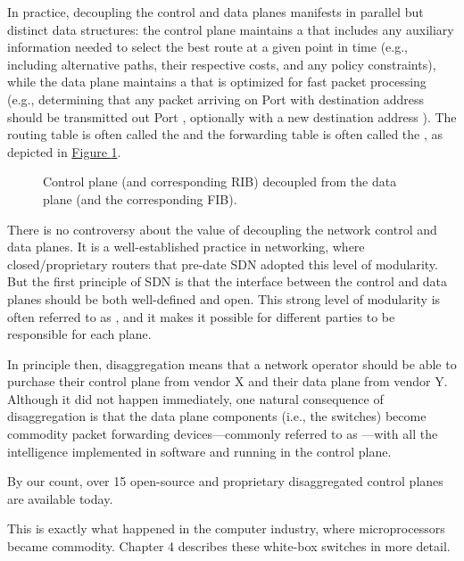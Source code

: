 \documentclass[letterpaper,11pt,english]{sphinxmanual}
\let\sphinxpxdimen\pdfpxdimen\else\newdimen\sphinxpxdimen
\begin{document}
In practice, decoupling the control and data planes manifests in
parallel but distinct data structures: the control plane maintains a
 that includes any auxiliary information needed to
select the best route at a given point in time (e.g., including
alternative paths, their respective costs, and any policy
constraints), while the data plane maintains a  that
is optimized for fast packet processing (e.g., determining that any
packet arriving on Port  with destination address  should be
transmitted out Port , optionally with a new destination address
). The routing table is often called the  and the forwarding table is often called the , as depicted in \hyperref[\detokenize{intro:fig-fib}]{Figure \ref{\detokenize{intro:fig-fib}}}.

\begin{figure}[htbp]
\centering
\capstart

\noindent\sphinxincludegraphics[width=300\sphinxpxdimen]{{Slide24}.png}
\caption{Control plane (and corresponding RIB) decoupled from the data
plane (and the corresponding FIB).}\label{\detokenize{intro:id11}}\label{\detokenize{intro:fig-fib}}\end{figure}

There is no controversy about the value of decoupling the network
control and data planes. It is a well-established practice in
networking, where closed/proprietary routers that pre-date SDN adopted
this level of modularity. But the first principle of SDN is that the
interface between the control and data planes should be both
well-defined and open. This strong level of modularity is often
referred to as , and it makes it possible for
different parties to be responsible for each plane.

In principle then, disaggregation means that a network operator should
be able to purchase their control plane from vendor X and their data
plane from vendor Y. Although it did not happen immediately, one
natural consequence of disaggregation is that the data plane
components (i.e., the switches) become commodity packet forwarding
devices—commonly referred to as —with all the
intelligence implemented in software and running in the control
plane.%
\begin{footnote}[1]\sphinxAtStartFootnote
By our count, over 15 open-source and proprietary disaggregated
control planes are available today.
%
\end{footnote} This is exactly what happened in the computer industry, where
microprocessors became commodity. Chapter 4 describes these white-box
switches in more detail.
\end{document}
